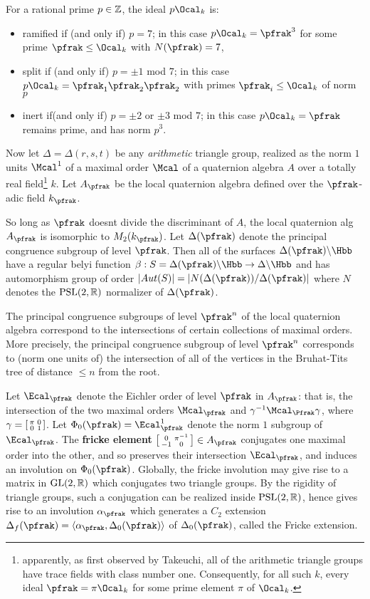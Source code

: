 \documentclass[11pt]{amsart}
\begin{document}
For a rational prime $p \in \mathbb{Z}$, the ideal $p\Ocal_k$ is:
	\begin{itemize}
		\item ramified if (and only if) $p=7$; in this case $p\Ocal_k=\pfrak^3$ for some prime $\pfrak \leq \Ocal_k$ with $N(\pfrak)=7$,
		\item split if (and only if) $p=\pm 1$ mod $7$; in this case $p\Ocal_k=\pfrak_1 \pfrak_2 \pfrak_2$ with primes $\pfrak_i \leq \Ocal_k$ of norm $p$
		\item inert if(and only if) $p=\pm 2$ or $\pm 3$ mod $7$; in this case $p\Ocal_k=\pfrak$ remains prime, and has norm $p^3$.
	\end{itemize}

Now let $\Delta=\Delta(r,s,t)$ be any \emph{arithmetic} triangle group, realized as the norm $1$ units $\Mcal^1$ of a maximal order $\Mcal$ of a quaternion algebra $A$ over a totally real field\footnote{apparently, as first observed by Takeuchi, all of the arithmetic triangle groups have trace fields with class number one. Consequently, for all such $k$, every ideal $\pfrak=\pi \Ocal_k$ for some prime element $\pi$ of $\Ocal_k$.} $k$. Let $A_\pfrak$ be the local quaternion algebra defined over the $\pfrak$-adic field $k_\pfrak$.

So long as $\pfrak$ doesnt divide the discriminant of $A$, the local quaternion alg $A_\pfrak$ is isomorphic to $M_2(k_\pfrak)$. Let $\Delta(\pfrak)$ denote the principal congruence subgroup of level $\pfrak$. Then all of the surfaces $\Delta(\pfrak) \lmod \Hbb$ have a regular belyi function $\beta: S=\Delta(\pfrak) \lmod \Hbb \to \Delta \lmod \Hbb$ and has automorphism group of order $\abs{Aut(S)}=\abs{N(\Delta(\pfrak))/\Delta(\pfrak)}$ where $N$ denotes the $\operatorname{PSL}(2,\mathbb{R})$ normalizer of $\Delta(\pfrak)$.

The principal congruence subgroups of level $\pfrak^n$ of the local quaternion algebra correspond to the intersections of certain collections of maximal orders. More precisely, the principal congruence subgroup of level $\pfrak^n$ corresponds to (norm one units of) the intersection of all of the vertices in the Bruhat-Tits tree of distance $\leq n$ from the root.

Let $\Ecal_\pfrak$ denote the Eichler order of level $\pfrak$ in $A_\pfrak$: that is, the intersection of the two maximal orders $\Mcal_\pfrak$ and $\gamma^\inv \Mcal_\Pfrak \gamma $, where $\gamma=\left[ \begin{smallmatrix} \pi & 0 \\ 0 & 1 \end{smallmatrix} \right]$. Let $\Phi_0(\pfrak)=\Ecal_\pfrak^1$ denote the norm $1$ subgroup of $\Ecal_\pfrak$. The \textbf{fricke element} $\tbt{0}{\pi ^\inv}{-1}{0} \in A_\pfrak$ conjugates one maximal order into the other, and so preserves their intersection $\Ecal_\pfrak$, and induces an involution on $\Phi_0(\pfrak)$. Globally, the fricke involution may give rise to a matrix in $\operatorname{GL}(2,\mathbb{R})$ which conjugates two triangle groups. By the rigidity of triangle groups, such a conjugation can be realized inside $\operatorname{PSL}(2,\mathbb{R})$, hence gives rise to an involution $\alpha_\pfrak$ which generates a $C_2$ extension $\Delta_{f}(\pfrak)= \langle\alpha_\pfrak, \Delta_0(\pfrak) \rangle$ of $\Delta_0(\pfrak)$, called the Fricke extension.
\end{document}
